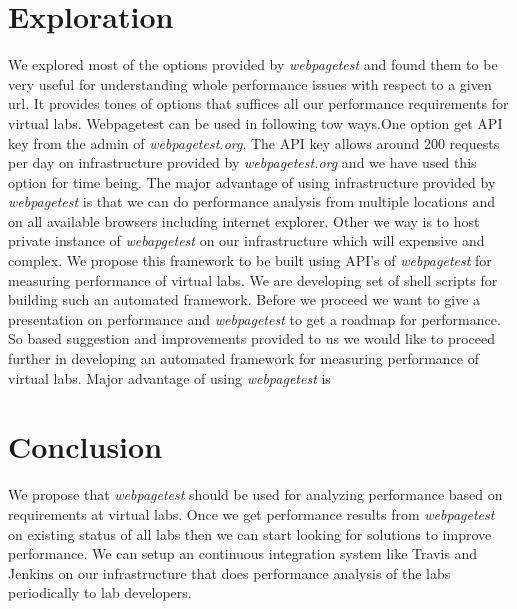 \documentclass[a4paper,10pt]{article}
\begin{document}
\section{Exploration}
We explored most of the options provided by {\it webpagetest} and found them to be very useful for understanding whole
performance issues with respect to a given url. It provides tones of options that suffices all our performance requirements
for virtual labs. Webpagetest can be used in following tow ways.One option get API key from the admin of {\it webpagetest.org}.
The API key allows around 200 requests per day 
on infrastructure provided by {\it webpagetest.org} and we have used this option for time being.
The major advantage of using infrastructure provided by {\it webpagetest} is that we can do performance analysis from multiple locations
and on all available browsers including internet explorer. 
Other we way is to host private instance of {\it webapgetest} on our infrastructure which will expensive and complex.
We propose this framework to be built using API's of {\it webpagetest}
for measuring performance of virtual labs. We are developing set of shell scripts for building such an automated framework.
Before we proceed we want to
give a presentation on performance and {\it webpagetest} to get a roadmap for performance. So based suggestion and improvements
provided to us we would like to proceed further in developing an automated framework for measuring performance of virtual labs.
Major advantage of using {\it webpagetest} is 

\section{Conclusion}
We propose that {\it webpagetest} should be used for analyzing performance based on requirements at virtual labs. Once we get
performance results from {\it webpagetest} on existing status of all labs then we can start looking for solutions to improve performance.
We can setup an continuous integration system like Travis and Jenkins on our infrastructure that does performance analysis of the labs
periodically to lab developers. 
\end{document}
